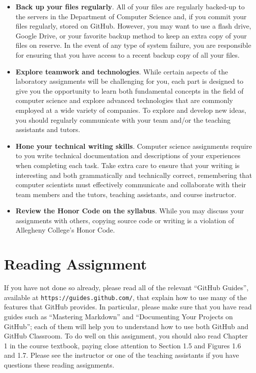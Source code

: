 \documentclass[11pt]{article}
\newcommand{\url}[1]{\lstinline{#1}}
\begin{document}
\begin{itemize}
\item {\bf Back up your files regularly}. All of your files are regularly backed-up to the servers in the Department of
  Computer Science and, if you commit your files regularly, stored on GitHub. However, you may want to use a flash
  drive, Google Drive, or your favorite backup method to keep an extra copy of your files on reserve. In the event of
  any type of system failure, you are responsible for ensuring that you have access to a recent backup copy of all your
  files.

\item {\bf Explore teamwork and technologies}. While certain aspects of the laboratory assignments will be challenging
  for you, each part is designed to give you the opportunity to learn both fundamental concepts in the field of computer
  science and explore advanced technologies that are commonly employed at a wide variety of companies. To explore and
  develop new ideas, you should regularly communicate with your team and/or the teaching assistants and tutors.

\item {\bf Hone your technical writing skills}. Computer science assignments require to you write technical
  documentation and descriptions of your experiences when completing each task. Take extra care to ensure that your
  writing is interesting and both grammatically and technically correct, remembering that computer scientists must
  effectively communicate and collaborate with their team members and the tutors, teaching assistants, and course
  instructor.

\item {\bf Review the Honor Code on the syllabus}. While you may discuss your assignments with others, copying source
  code or writing is a violation of Allegheny College's Honor Code.

\end{itemize}

\section*{Reading Assignment}

If you have not done so already, please read all of the relevant ``GitHub Guides'', available at
\url{https://guides.github.com/}, that explain how to use many of the features that GitHub provides. In particular,
please make sure that you have read guides such as ``Mastering Markdown'' and ``Documenting Your Projects on GitHub'';
each of them will help you to understand how to use both GitHub and GitHub Classroom. To do well on this assignment, you
should also read Chapter 1 in the course textbook, paying close attention to Section 1.5 and Figures 1.6 and 1.7. Please
see the instructor or one of the teaching assistants if you have questions these reading assignments.
\end{document}
